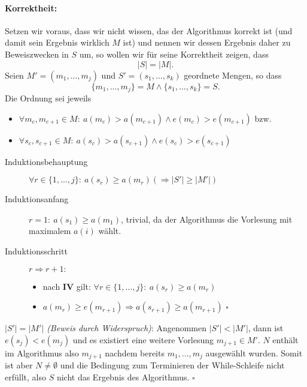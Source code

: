 \documentclass[a4paper,10pt]{article}
\begin{document}
\begin{enumerate}
        \paragraph*{Korrektheit:} Setzen wir voraus, dass wir nicht wissen, das der Algorithmus korrekt ist (und damit sein Ergebnis wirklich $M$ ist) und nennen wir dessen Ergebnis daher zu Beweiszwecken in $S$ um, so wollen wir für seine Korrektheit zeigen, dass
        \[|S| = |M|.\]
        Seien $M' = (m_1, ..., m_j)$ und $S' = (s_1, ..., s_k)$ geordnete Mengen, so dass 
        \[\{m_1,...,m_j\} = M \land \{s_1,...,s_k\} = S.\] 
        Die Ordnung sei jeweils 
        \begin{itemize} 
        \item   $\forall m_{c}, m_{c+1} \in M{:}\ a(m_{c}) > a(m_{c+1}) \land e(m_{c}) > e(m_{c+1})$ bzw.
        \item   $\forall s_{c}, s_{c+1} \in M{:}\ a(s_{c}) > a(s_{c+1}) \land e(s_{c}) > e(s_{c+1})$
        \end{itemize}
        \begin{description}
        \item[Induktionsbehauptung] $\forall r \in \{1,...,j\}{:}\ a(s_r) \geq a(m_r) (\Rightarrow |S'| \geq |M'|)$
        \item[Induktionsanfang] $r = 1{:}\ a(s_1) \geq a(m_1)$, trivial, da der Algorithmus die Vorlesung mit maximalem $a(i)$ wählt.
        \item[Induktionsschritt] $r \Rightarrow r+1{:}$
        \begin{itemize}
        \item   nach \textbf{IV} gilt: $\forall r \in \{1,...,j\}{:}\ a(s_r) \geq a(m_r)$
        \item   $a(m_r) \geq e(m_{r+1}) \Rightarrow a(s_{r+1}) \geq a(m_{r+1})$ \hfill $\square$
        \end{itemize}
        \end{description}
        \textit{$|S'| = |M'|$ (Beweis durch Widerspruch)}: Angenommen $|S'| < |M'|$, dann ist $e(s_j) < e(m_j)$ und es existiert eine weitere Vorlesung $m_{j+1} \in M'$. $N$ enthält im Algorithmus also $m_{j+1}$ nachdem bereits $m_1, ..., m_j$ ausgewählt wurden. Somit ist aber $N \neq \emptyset$ und die Bedingung zum Terminieren der While-Schleife nicht erfüllt, also $S$ nicht das Ergebnis des Algorithmus. \hfill $\square$

\end{enumerate}
\end{document}
